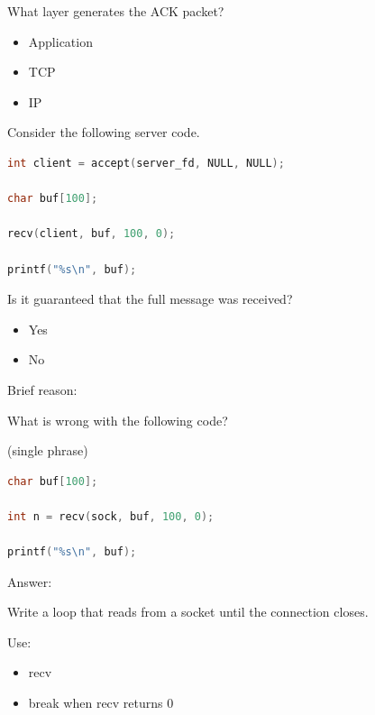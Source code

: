 \begin{questions}
	\question[10]

	What layer generates the ACK packet?

	\begin{itemize}
		\item Application
		\item TCP
		\item IP
	\end{itemize}

	\question[12]

	Consider the following server code.

	\begin{lstlisting}[language=C]
int client = accept(server_fd, NULL, NULL);

char buf[100];

recv(client, buf, 100, 0);

printf("%s\n", buf);
\end{lstlisting}

	Is it guaranteed that the full message was received?

	\begin{itemize}
		\item Yes
		\item No
	\end{itemize}

	Brief reason:

	\vspace{2cm}

	\question[12]

	What is wrong with the following code?

	(single phrase)

	\begin{lstlisting}[language=C]
char buf[100];

int n = recv(sock, buf, 100, 0);

printf("%s\n", buf);
\end{lstlisting}

	Answer:

	\vspace{2cm}

	\question[15]

	Write a loop that reads from a socket until the connection closes.

	Use:

	\begin{itemize}
		\item recv
		\item break when recv returns 0
	\end{itemize}

	\vspace{6cm}

\end{questions}

